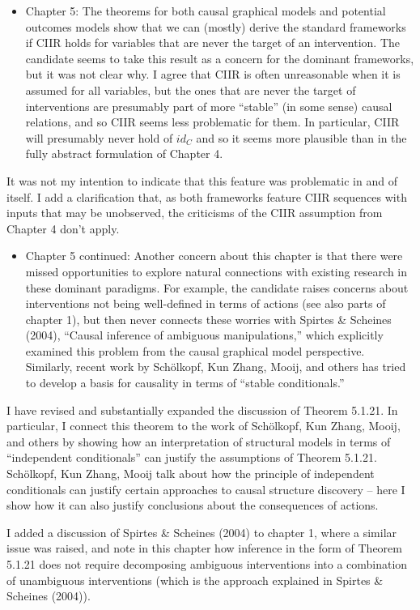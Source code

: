 \documentclass[12pt, a4paper]{article}
\begin{document}
\begin{itemize}
    \item Chapter 5: The theorems for both causal graphical models and potential outcomes models show that we can (mostly) derive the standard frameworks if CIIR holds for variables that are never the target of an intervention. The candidate seems to take this result as a concern for the dominant frameworks, but it was not clear why. I agree that CIIR is often unreasonable when it is assumed for all variables, but the ones that are never the target of interventions are presumably part of more “stable” (in some sense) causal relations, and so CIIR seems less problematic for them. In particular, CIIR will presumably never hold of $id_C$ and so it seems more plausible than in the fully abstract formulation of Chapter 4.
\end{itemize}


It was not my intention to indicate that this feature was problematic in and of itself. I add a clarification that, as both frameworks feature CIIR sequences with inputs that may be unobserved, the criticisms of the CIIR assumption from Chapter 4 don't apply.

\begin{itemize}
    \item Chapter 5 continued: Another concern about this chapter is that there were missed opportunities to explore natural connections with existing research in these dominant paradigms. For example, the candidate raises concerns about interventions not being well-defined in terms of actions (see also parts of chapter 1), but then never connects these worries with Spirtes \& Scheines (2004), “Causal inference of ambiguous manipulations,” which explicitly examined this problem from the causal graphical model perspective. Similarly, recent work by Schölkopf, Kun Zhang, Mooij, and others has tried to develop a basis for causality in terms of “stable conditionals.”
\end{itemize}

I have revised and substantially expanded the discussion of Theorem 5.1.21. In particular, I connect this theorem to the work of Schölkopf, Kun Zhang, Mooij, and others by showing how an interpretation of structural models in terms of ``independent conditionals'' can justify the assumptions of Theorem 5.1.21. Schölkopf, Kun Zhang, Mooij talk about how the principle of independent conditionals can justify certain approaches to causal structure discovery -- here I show how it can also justify conclusions about the consequences of actions.

I added a discussion of Spirtes \& Scheines (2004) to chapter 1, where a similar issue was raised, and note in this chapter how inference in the form of Theorem 5.1.21 does not require decomposing ambiguous interventions into a combination of unambiguous interventions (which is the approach explained in Spirtes \& Scheines (2004)).
\end{document}
